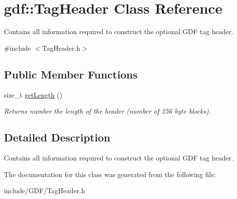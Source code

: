 \hypertarget{classgdf_1_1_tag_header}{
\section{gdf::TagHeader Class Reference}
\label{classgdf_1_1_tag_header}
}


Contains all information required to construct the optional GDF tag header.  




{\ttfamily \#include $<$TagHeader.h$>$}

\subsection*{Public Member Functions}
\begin{DoxyCompactItemize}
\item 
\hypertarget{classgdf_1_1_tag_header_a27ca1dab24ac2407af9071831876059b}{
size\_\-t \hyperlink{classgdf_1_1_tag_header_a27ca1dab24ac2407af9071831876059b}{getLength} ()}
\label{classgdf_1_1_tag_header_a27ca1dab24ac2407af9071831876059b}

\begin{DoxyCompactList}\small\item\em Returns number the length of the header (number of 256 byte blocks). \item\end{DoxyCompactList}\end{DoxyCompactItemize}


\subsection{Detailed Description}
Contains all information required to construct the optional GDF tag header. 

The documentation for this class was generated from the following file:\begin{DoxyCompactItemize}
\item 
include/GDF/TagHeader.h\end{DoxyCompactItemize}
